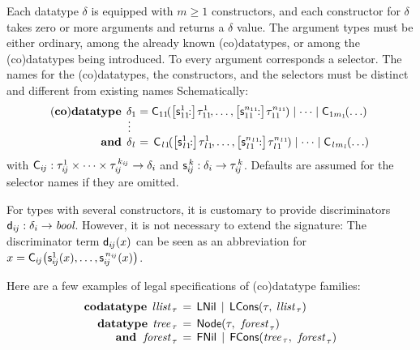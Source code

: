 Each datatype $\delta$ is equipped with
$m \ge 1$ constructors, and each constructor for $\delta$ takes zero or more
arguments and returns a $\delta$ value. The argument types must be either
ordinary, among the already known (co)datatypes, or among the (co)datatypes
being introduced.
%
To every argument corresponds a selector. The names for the (co)data\-types, the
constructors, and the selectors must be distinct and different from
existing names%
Schematically:
%
\[
\begin{aligned}[t]
\!(\keyw{co})\keyw{datatype}\;\,
  \delta_1 & {}= \smash{\const{C}_{11\!}(\bigl[\const{s}_{11\!}^1{:}\bigr]\vthinspace \tau_{11\!}^1, \ldots, \bigl[\const{s}_{11\!}^{n_{11\!}}{:}\bigr]\vthinspace \tau_{11\!}^{n_{11\!}})} \mid \cdots \mid \smash{\const{C}_{1m_1\!}(\ldots)} \\
   \smash{\vdots\,\,\,} \\[-1\jot]
  \keyw{and}\; \,\delta_{\elllx} & =\, \smash{\const{C}_{\elll 1\!}(\bigl[\const{s}_{\elll 1\!}^1{:}\bigr]\vthinspace \tau_{\elll 1\!}^1, \ldots, \bigl[\const{s}_{\elll 1\!}^{n_{\elll 1\!}}{:}\bigr]\vthinspace \tau_{\elll 1\!}^{n_{\elll 1\!}})} \mid \cdots \mid \smash{\const{C}_{\elll m_{\elllx}\!}(\ldots)}
\end{aligned}
\]
%
with
$\textsf{C}_{i\kern-0.083333em j} : \tau_{i\kern-0.083333em j}^1\times\cdots\times\tau_{i\kern-0.083333em j}^{\,k_{\smash{i\kern-0.083333em j}}} \to \delta_i$
and $\textsf{s}_{i\kern-0.083333em j}^{\,k} : \delta_i \to \tau_{i\kern-0.083333em j}^{\,k}$. Defaults are assumed for
the selector names if they are omitted.

For types with several constructors, it is customary to provide discriminators
$\textsf{d}_{i\kern-0.083333em j} : \delta_i \to \textit{bool}$. However,
it is not necessary to extend the signature:
The discriminator term $\textsf{d}_{i\kern-0.083333em j}(x)$ can be seen as an abbreviation for
$x = \textsf{C}_{i\kern-0.083333em j}\bigl(\textsf{s}_{i\kern-0.083333em j}^1(x), \ldots, \textsf{s}_{i\kern-0.083333em j}^{\,n_{\smash{{i\kern-0.083333em j}}}}(x)\bigr)$.

Here are a few examples of legal specifications of (co)datatype families:
\[\begin{aligned}[t]
      \keyw{codatatype}\; \,\ty{llist}_{\,\tau} & \,=\, \const{LNil} \,\mid\, \const{LCons}(%
      \tau,\: %
      \ty{llist}_{\,\tau}) \\%
      \keyw{datatype}\;\, \ty{tree}_{\,\tau} & \,=\, \const{Node}(\tau,\:\, \ty{forest}_{\,\tau}) \\[-\jot]
      \keyw{and}\;\,\, \ty{forest}_{\,\tau} & \,=\, \const{FNil} \,\mid\, \const{FCons}(\ty{tree}_{\,\tau},\:\, \ty{forest}_{\,\tau})
\end{aligned}
\]

